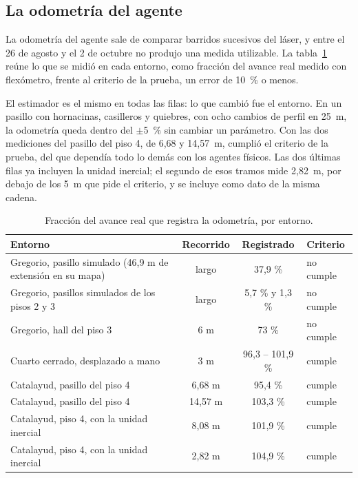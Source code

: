 \subsection{La odometría del agente}

La odometría del agente sale de comparar barridos sucesivos del láser, y entre el 26 de agosto y el 2 de octubre no produjo una medida utilizable. La tabla~\ref{tab:odometria}
reúne lo que se midió en cada entorno, como fracción del avance real medido con flexómetro, frente al criterio de la prueba, un error de 10~\% o menos.

El estimador es el mismo en todas las filas: lo que cambió fue el entorno. En un pasillo con hornacinas, casilleros y quiebres, con ocho cambios de perfil en 25~m, la odometría queda dentro del $\pm$5~\% sin cambiar un parámetro. Con las dos mediciones del pasillo del piso 4, de 6,68 y 14,57~m, cumplió el criterio de la prueba, del que dependía todo lo demás con los agentes físicos. Las dos últimas filas ya incluyen la unidad inercial; el segundo de esos tramos mide 2,82~m, por debajo de los 5~m que pide el criterio, y se incluye como dato de la misma cadena.

\begin{table}[H]
  \centering\small
  \caption{Fracción del avance real que registra la odometría, por entorno.}
  \label{tab:odometria}
  \begin{tabular}{@{}p{}ccl@{}}
    \toprule
    \textbf{Entorno} & \textbf{Recorrido} & \textbf{Registrado} & \textbf{Criterio} \\ \midrule
    Gregorio, pasillo simulado (46,9 m de extensión en su mapa) & largo & 37,9 \% & no cumple \\
    Gregorio, pasillos simulados de los pisos 2 y 3 & largo & 5,7 \% y 1,3 \% & no cumple \\
    Gregorio, hall del piso 3 & 6 m & 73 \% & no cumple \\
    Cuarto cerrado, desplazado a mano & 3 m & 96,3 -- 101,9 \% & cumple \\
    Catalayud, pasillo del piso 4 & 6,68 m & 95,4 \% & cumple \\
    Catalayud, pasillo del piso 4 & 14,57 m & 103,3 \% & cumple \\
    Catalayud, piso 4, con la unidad inercial & 8,08 m & 101,9 \% & cumple \\
    Catalayud, piso 4, con la unidad inercial & 2,82 m & 104,9 \% & cumple \\ \bottomrule
  \end{tabular}
\end{table}

